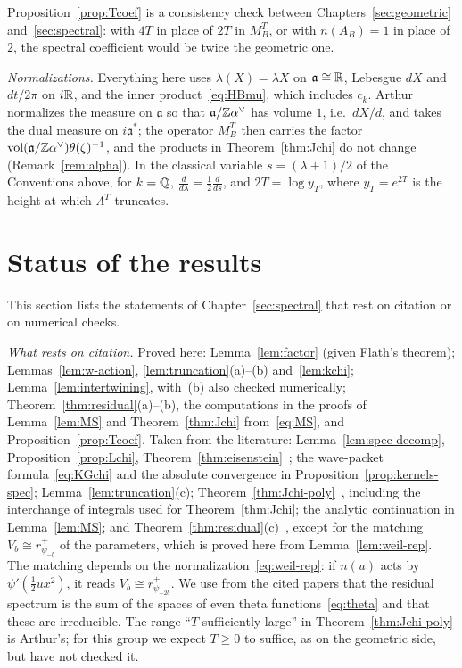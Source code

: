 Proposition~\ref{prop:Tcoef} is a consistency check between
Chapters~\ref{sec:geometric} and~\ref{sec:spectral}: with $4T$ in place
of $2T$ in $M_B^T$, or with $n(A_B)=1$ in place of $2$, the spectral
coefficient would be twice the geometric one.

\begin{remarkrev}\label{rem:sec5-norm}
\emph{Normalizations.} Everything here uses $\lambda(X)=\lambda X$ on
$\mathfrak a\cong\mathbb{R}$, Lebesgue $dX$ and $dt/2\pi$ on $i\mathbb{R}$, and the inner
product~\eqref{eq:HBmu}, which includes $c_k$. Arthur normalizes the
measure on $\mathfrak a$ so that $\mathfrak a/\mathbb{Z}\alpha^\vee$ has volume
$1$, i.e.\ $dX/d$, and takes the dual measure on $i\mathfrak a^*$; the
operator $M_B^T$ then carries the factor $\operatorname{vol}(\mathfrak a/
\mathbb{Z}\alpha^\vee)\theta(\zeta)^{-1}$, and the products in
Theorem~\ref{thm:Jchi} do not change (Remark~\ref{rem:alpha}). In the
classical variable $s=(\lambda+1)/2$ of the Conventions above, for
$k=\mathbb{Q}$, $\frac{d}{d\lambda}=\frac12\frac{d}{ds}$, and $2T=\log y_T$, where
$y_T=e^{2T}$ is the height at which $\Lambda^T$ truncates.
\end{remarkrev}

\section{Status of the results}\label{sec:status5}

This section lists the statements of Chapter~\ref{sec:spectral} that
rest on citation or on numerical checks.


\begin{remarkrev}\label{rem:sec5-status}
\emph{What rests on citation.} Proved here: Lemma~\ref{lem:factor} (given Flath's
theorem); Lemmas~\ref{lem:w-action}, \ref{lem:truncation}(a)--(b)
and~\ref{lem:kchi}; Lemma~\ref{lem:intertwining}, with~(b) also checked
numerically;
Theorem~\ref{thm:residual}(a)--(b), the computations in the proofs of
Lemma~\ref{lem:MS} and Theorem~\ref{thm:Jchi} from~\eqref{eq:MS}, and
Proposition~\ref{prop:Tcoef}. Taken from the literature:
Lemma~\ref{lem:spec-decomp}, Proposition~\ref{prop:Lchi},
Theorem~\ref{thm:eisenstein}~\cite{La76,MW95}; the wave-packet formula~\eqref{eq:KGchi} and the
absolute convergence in Proposition~\ref{prop:kernels-spec};
Lemma~\ref{lem:truncation}(c); Theorem~\ref{thm:Jchi-poly}~\cite{Ar80,Li13}, including the interchange of integrals used for
Theorem~\ref{thm:Jchi}; the analytic continuation in Lemma~\ref{lem:MS};
and Theorem~\ref{thm:residual}(c)~\cite{Ge76,GPS80,Wa80}, except for
the matching $V_b\cong r^+_{\psi_{-b}}$ of the parameters, which is proved
here from Lemma~\ref{lem:weil-rep}. The matching depends on the
normalization~\eqref{eq:weil-rep}: if $n(u)$ acts by $\psi'(\frac12ux^2)$,
it reads $V_b\cong r^+_{\psi_{-2b}}$. We use from the cited papers that
the residual spectrum is the sum of the spaces of even theta
functions~\eqref{eq:theta} and that these are irreducible. The range ``$T$ sufficiently large'' in
Theorem~\ref{thm:Jchi-poly} is Arthur's; for this group we expect $T\ge0$
to suffice, as on the geometric side, but have not checked it.
\end{remarkrev}

